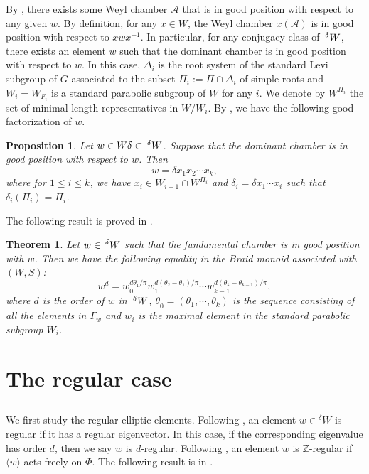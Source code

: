 \documentclass[12pt,leqno]{article}
\newtheorem{theorem}[equation]{Theorem}
\newtheorem{proposition}[equation]{Proposition}
\newcommand{\caA}{\mathcal A}
\newcommand{\G}{G}
\renewcommand{\sec}[1]{\section{#1}
\renewcommand{\theequation}{\thesection.\arabic{equation}}
  \setcounter{equation}{0}}
\newcommand{\Wext}{\negthinspace\negthinspace\phantom{a}^\delta W}
\def\le{\leqslant}
\def\G{\Gamma}
\def\d{\delta}
\def\D{\Delta}
\renewcommand{\sec}[1]{\section{#1}
\renewcommand{\theequation}{\thesection.\arabic{equation}}
  \setcounter{equation}{0}}
\begin{document}
By \cite[Lemma 5.1]{he_nie_minimal_finite}, there exists some Weyl chamber $\caA$ that is
in good position with respect to any given $w$. By definition, for any
$x \in W$, the Weyl chamber $x(\caA)$ is in good position with respect
to $x w x^{-1}$. In particular, for any conjugacy class of $\Wext$,
there exists an element $w$ such that the dominant chamber is in good
position with respect to $w$. In this case, $\D_i$ is the root system
of the standard Levi subgroup of $G$ associated to the subset
$\Pi_i:=\Pi \cap \D_i$ of simple roots and $W_i=W_{F_i}$ is a standard
parabolic subgroup of $W$ for any $i$. We denote by $W^{\Pi_i}$ the
set of minimal length representatives in $W/W_i$. By \cite[Proposition
2.2]{he_nie_minimal_finite}, we have the following good factorization of $w$.

\begin{proposition}\label{good-fac} Let $w \in W \d \subset
\Wext$. Suppose that the dominant chamber is in good position with
respect to $w$. Then $$w=\d x_1 x_2 \cdots x_k,$$ where for $1 \le i
\le k$, we have $x_i \in W_{i-1} \cap W^{\Pi_i}$ and $\d_i=\d x_1
\cdots x_{i}$ such that $\d_i (\Pi_i)=\Pi_i$.
\end{proposition}

The following result is proved in \cite[Theorem 5.3]{he_nie_minimal_finite}.

\begin{theorem} Let $w \in \Wext$ such that the fundamental chamber is
in good position with $w$. Then we have the following equality in the
Braid monoid associated with $(W, S)$: $$\underline w^d=\underline
w_0^{d \theta_1/\pi} \underline w_1^{d (\theta_2-\theta_1)/\pi} \cdots
\underline w_{k-1}^{d (\theta_{k}-\theta_{k-1})/\pi},$$ where $d$ is
the order of $w$ in $\Wext$, $\underline \theta_0=(\theta_1, \cdots,
\theta_k)$ is the sequence consisting of all the elements in $\G_{w}$
and $w_i$ is the maximal element in the standard parabolic subgroup
$W_i$.
\end{theorem}


\sec{The regular case}

\subsection{} We first study the regular elliptic elements. Following
\cite{springer_regular}, an element $w \in {}^{\delta} W$ is regular if it has a
regular eigenvector. In this case, if the corresponding eigenvalue has
order $d$, then we say $w$ is $d$-regular. Following \cite{rgly}, an
element $w$ is $\mathbb Z$-regular if $\langle w\rangle$ acts freely
on $\Phi$. The following result is in \cite[Lemma 7.2]{AH}.
\end{document}
